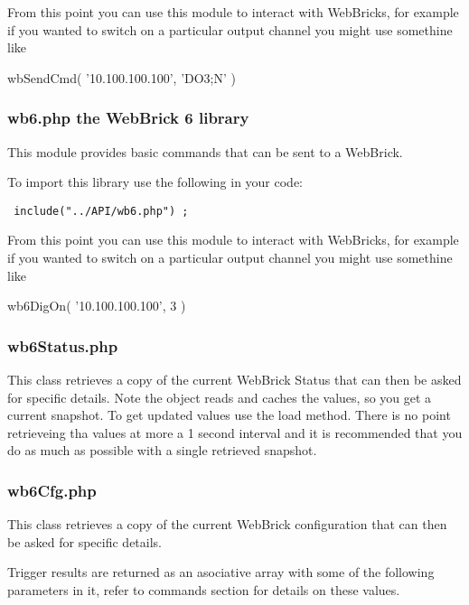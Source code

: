 From this point you can use this module to interact with WebBricks, for example
if you wanted to switch on a particular output channel you might use
somethine like

wbSendCmd( '10.100.100.100', 'DO3;N' )

\subsubsection{wb6.php the WebBrick 6 library}

This module provides basic commands that can be sent to a WebBrick.

To import this library use the following in your code:

\begin{verbatim} include("../API/wb6.php") ;\end{verbatim}

From this point you can use this module to interact with WebBricks, for example
if you wanted to switch on a particular output channel you might use
somethine like

wb6DigOn( '10.100.100.100', 3 )


\subsubsection{wb6Status.php}

This class retrieves a copy of the current WebBrick Status that can then be asked for specific details. Note
the object reads and caches the values, so you get a current snapshot. To get updated values use the load method.
There is no point retrieveing tha values at more a 1 second interval and it is recommended that you do as much as possible
with a single retrieved snapshot.


\subsubsection{wb6Cfg.php}
This class retrieves a copy of the current WebBrick configuration that can then be asked for specific details.

Trigger results are returned as an asociative array with some of the following parameters in it, refer to commands 
section for details on these values.

